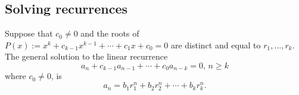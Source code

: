 \subsection{Solving recurrences}
\begin{thm}
Suppose that $c_0\ne 0$ and the roots of $P(x):=x^{k}+c_{k-1}x^{k-1}+\cdots +c_1x+c_0=0$ are distinct and equal to $r_1,\ldots, r_k$. 
The general solution to the linear recurrence
\[
a_n+c_{k-1}a_{n-1}+\cdots +c_0a_{n-k}=0,\,n\ge k
\]
where $c_0\ne 0$, is 
\begin{equation}\label{gensoln}
a_n=b_1r_1^n+b_2r_2^n+\cdots +b_kr_k^n.
\end{equation}
\end{thm}
